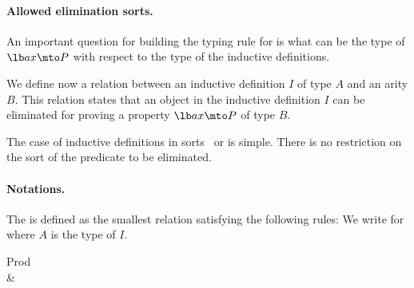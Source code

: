 

\paragraph[Allowed elimination sorts.]{Allowed elimination sorts.}

An important question for building the typing rule for  is
what can be the type of $\lb a x \mto P$ with respect to the type of the inductive
definitions.

We define now a relation  between an inductive
definition $I$ of type $A$ and an arity $B$. This relation states that
an object in the inductive definition $I$ can be eliminated for
proving a property $\lb a x \mto P$ of type $B$.

The case of inductive definitions in sorts \Set\ or \Type{} is simple.
There is no restriction on the sort of the predicate to be
eliminated. 

\paragraph{Notations.}
The  is defined as the smallest relation satisfying the
following rules:
We write  for  where $A$ is the type of
$I$.

\begin{description}
\item[Prod] 
\item[{\Set} \& \Type] 
\end{description}

